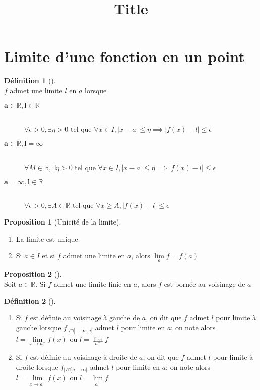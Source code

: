 \documentclass{article}
\title{Title}
\newcommand{\R}{\mathbb{R}}
\newcommand{\tq}{\text{ tel que }}
\newcommand{\lm}{\lim\limits}
\newcommand{\bs}[1]{\boldsymbol{#1}}
\theoremstyle{definition}
\newtheorem*{prop}{Proposition}
\newtheorem*{defin}{Définition}
\theoremstyle{remark}
\theoremstyle{plain}
\newenvironment{prp}[1][]
{\begin{prop}[#1]\quad\\}
{\end{prop}}
\newenvironment{dfn}[1][]
{\begin{defin}[#1]\quad\\}
{\end{defin}}
\begin{document}
\maketitle
\pagebreak

\section{Limite d'une fonction en un point}
\begin{dfn} 
$f$ admet une limite $l$ en $a$ lorsque
\begin{description}
    \item[$\bs{a \in \R, l \in \R}$] \hfill \\
    $\forall \epsilon > 0, \exists \eta > 0 \tq \forall x \in I, |x - a|
    \leq \eta \implies |f(x) - l| \leq \epsilon$
    \item[$\bs{a \in \R, l = \infty}$] \hfill \\
    $\forall M \in \R, \exists \eta > 0 \tq \forall x \in I,
    |x - a| \leq \eta \implies |f(x) - l| \leq \epsilon$
    \item[$\bs{a = \infty, l \in \R}$] \hfill \\
    $\forall \epsilon > 0, \exists A \in \R \tq \forall x \geq A,
    |f(x) - l| \leq \epsilon$
\end{description}
\end{dfn}

\begin{prp}[Unicité de la limite] 
\begin{enumerate}
    \item La limite est unique
    \item Si $a \in I$ et si $f$ admet une limite en $a$, alors
    $\lm_{a} f = f(a)$
\end{enumerate}
\end{prp}

\begin{prp} 
Soit $a \in \bar{\R}$. Si $f$ admet une limite finie en $a$, alors
$f$ est bornée au voisinage de $a$
\end{prp}

\begin{dfn} 
\begin{enumerate}
    \item Si $f$ est définie au voisinage à gauche de $a$, on dit que
    $f$ admet $l$ pour limite à gauche lorsque $f_{|I\cap ]-\infty, a[}$
    admet $l$ pour limite en $a$; on note alors
    $l = \lm_{x \to a^-} f(x)$ ou $l = \lm_{a^-} f$
    \item Si $f$ est définie au voisinage à droite de $a$, on dit que
    $f$ admet $l$ pour limite à droite lorsque $f_{|I\cap ]a, +\infty[}$
    admet $l$ pour limite en $a$; on note alors
    $l = \lm_{x \to a^+} f(x)$ ou $l = \lm_{a^+} f$
\end{enumerate}
\end{dfn}
\end{document}
